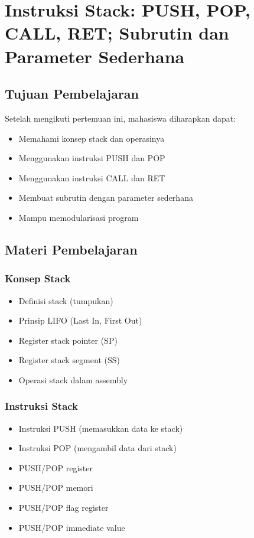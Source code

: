 \chapter{Instruksi Stack: PUSH, POP, CALL, RET; Subrutin dan Parameter Sederhana}

\section{Tujuan Pembelajaran}
Setelah mengikuti pertemuan ini, mahasiswa diharapkan dapat:
\begin{itemize}
\item Memahami konsep stack dan operasinya
\item Menggunakan instruksi PUSH dan POP
\item Menggunakan instruksi CALL dan RET
\item Membuat subrutin dengan parameter sederhana
\item Mampu memodularisasi program
\end{itemize}

\section{Materi Pembelajaran}

\subsection{Konsep Stack}
\begin{itemize}
\item Definisi stack (tumpukan)
\item Prinsip LIFO (Last In, First Out)
\item Register stack pointer (SP)
\item Register stack segment (SS)
\item Operasi stack dalam assembly
\end{itemize}

\subsection{Instruksi Stack}
\begin{itemize}
\item Instruksi PUSH (memasukkan data ke stack)
\item Instruksi POP (mengambil data dari stack)
\item PUSH/POP register
\item PUSH/POP memori
\item PUSH/POP flag register
\item PUSH/POP immediate value
\end{itemize}

